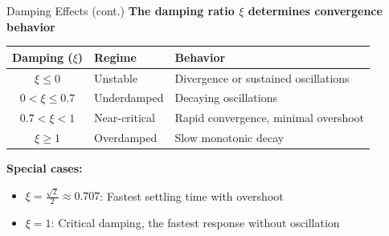 \documentclass[aspectratio=169,12pt]{beamer}
\begin{document}
\begin{frame}{Damping Effects (cont.)}
  \textbf{The damping ratio $\xi$ determines convergence behavior}

  \begin{table}
    \centering
    \begin{tabular}{@{}cll@{}}
      \toprule
      \textbf{Damping ($\xi$)} & \textbf{Regime} & \textbf{Behavior}                    \\
      \midrule
      $\xi \leq 0$             & Unstable        & Divergence or sustained oscillations \\
      $0 < \xi \leq 0.7$       & Underdamped     & Decaying oscillations                \\
      $0.7 < \xi < 1$          & Near-critical   & Rapid convergence, minimal overshoot \\
      $\xi \geq 1$             & Overdamped      & Slow monotonic decay                 \\
      \bottomrule
    \end{tabular}
  \end{table}

  \vspace{0.3cm}
  \textbf{Special cases:}
  \begin{itemize}
    \item $\xi = \frac{\sqrt{2}}{2} \approx 0.707$: Fastest settling time with overshoot
    \item $\xi = 1$: Critical damping, the fastest response without oscillation
  \end{itemize}
\end{frame}
\end{document}
